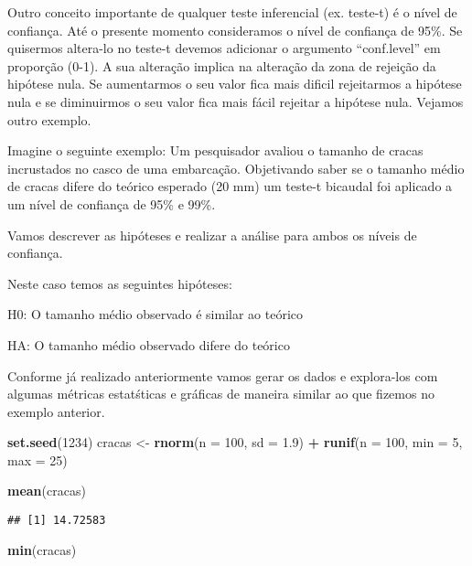 \documentclass[]{book}
\newenvironment{Shaded}{\begin{snugshade}}{\end{snugshade}}
\newcommand{\DataTypeTok}[1]{\textcolor[rgb]{0.13,0.29,0.53}{#1}}
\newcommand{\DecValTok}[1]{\textcolor[rgb]{0.00,0.00,0.81}{#1}}
\newcommand{\FloatTok}[1]{\textcolor[rgb]{0.00,0.00,0.81}{#1}}
\newcommand{\KeywordTok}[1]{\textcolor[rgb]{0.13,0.29,0.53}{\textbf{#1}}}
\newcommand{\NormalTok}[1]{#1}
\newcommand{\OperatorTok}[1]{\textcolor[rgb]{0.81,0.36,0.00}{\textbf{#1}}}
\newcommand{\StringTok}[1]{\textcolor[rgb]{0.31,0.60,0.02}{#1}}
\begin{document}
Outro conceito importante de qualquer teste inferencial (ex. teste-t) é o nível de confiança. Até o presente momento consideramos o nível de confiança de 95\%. Se quisermos altera-lo no teste-t devemos adicionar o argumento ``conf.level'' em proporção (0-1). A sua alteração implica na alteração da zona de rejeição da hipótese nula. Se aumentarmos o seu valor fica mais dificil rejeitarmos a hipótese nula e se diminuirmos o seu valor fica mais fácil rejeitar a hipótese nula. Vejamos outro exemplo.

Imagine o seguinte exemplo: Um pesquisador avaliou o tamanho de cracas incrustados no casco de uma embarcação. Objetivando saber se o tamanho médio de cracas difere do teórico esperado (20 mm) um teste-t bicaudal foi aplicado a um nível de confiança de 95\% e 99\%.

Vamos descrever as hipóteses e realizar a análise para ambos os níveis de confiança.

Neste caso temos as seguintes hipóteses:

H0: O tamanho médio observado é similar ao teórico

HA: O tamanho médio observado difere do teórico

Conforme já realizado anteriormente vamos gerar os dados e explora-los com algumas métricas estatśticas e gráficas de maneira similar ao que fizemos no exemplo anterior.

\begin{Shaded}
\begin{Highlighting}[]
\KeywordTok{set.seed}\NormalTok{(}\DecValTok{1234}\NormalTok{)}
\NormalTok{cracas <-}\StringTok{ }\KeywordTok{rnorm}\NormalTok{(}\DataTypeTok{n =} \DecValTok{100}\NormalTok{, }\DataTypeTok{sd =} \FloatTok{1.9}\NormalTok{) }\OperatorTok{+}\StringTok{ }\KeywordTok{runif}\NormalTok{(}\DataTypeTok{n =} \DecValTok{100}\NormalTok{, }\DataTypeTok{min =} \DecValTok{5}\NormalTok{, }\DataTypeTok{max =} \DecValTok{25}\NormalTok{)}

\KeywordTok{mean}\NormalTok{(cracas)}
\end{Highlighting}
\end{Shaded}

\begin{verbatim}
## [1] 14.72583
\end{verbatim}

\begin{Shaded}
\begin{Highlighting}[]
\KeywordTok{min}\NormalTok{(cracas)}
\end{Highlighting}
\end{Shaded}
\end{document}
